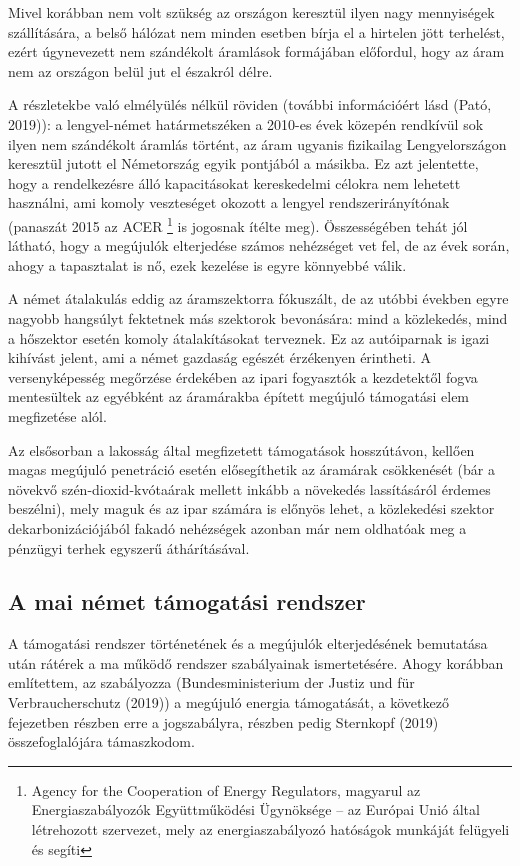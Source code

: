 \documentclass[twoside, magyar, showtrims]{corvinusphd}
\begin{document}
Mivel korábban nem volt szükség az országon
keresztül ilyen nagy mennyiségek szállítására,
a belső hálózat nem minden esetben
bírja el a hirtelen jött terhelést, ezért
úgynevezett nem szándékolt áramlások
formájában előfordul, hogy az áram nem
az országon belül jut el északról délre.

A részletekbe való elmélyülés nélkül röviden
(további információért lásd (Pató, 2019)):
a lengyel-német határmetszéken a 2010-es
évek közepén rendkívül sok ilyen nem szándékolt
áramlás történt, az áram ugyanis fizikailag
Lengyelországon keresztül jutott el
Németország egyik pontjából a másikba.
Ez azt jelentette, hogy a rendelkezésre álló
kapacitásokat kereskedelmi célokra nem lehetett
használni, ami komoly veszteséget okozott a lengyel
rendszerirányítónak (panaszát 2015 az
ACER \footnote{Agency for the Cooperation of Energy Regulators,
magyarul az Energiaszabályozók Együttműködési Ügynöksége
-- az Európai Unió által létrehozott szervezet, mely
az energiaszabályozó hatóságok munkáját felügyeli és segíti}
is jogosnak ítélte meg).
Összességében tehát jól látható,
hogy a megújulók elterjedése számos nehézséget
vet fel, de az évek során, ahogy a
tapasztalat is nő, ezek kezelése is egyre könnyebbé válik.

A német átalakulás eddig az áramszektorra fókuszált,
de az utóbbi években egyre nagyobb hangsúlyt
fektetnek más szektorok bevonására: mind a közlekedés,
mind a hőszektor esetén komoly
átalakításokat terveznek.
Ez az autóiparnak is igazi kihívást jelent,
ami a német gazdaság egészét érzékenyen érintheti.
A versenyképesség megőrzése érdekében
az ipari fogyasztók a kezdetektől fogva
mentesültek az egyébként az áramárakba
épített megújuló támogatási elem megfizetése alól.

Az elsősorban a lakosság által megfizetett támogatások hosszútávon,
kellően magas megújuló penetráció esetén elősegíthetik
az áramárak csökkenését (bár a növekvő szén-dioxid-kvótaárak mellett
inkább a növekedés lassításáról érdemes beszélni),
mely maguk és az ipar számára is előnyös lehet,
a közlekedési szektor dekarbonizációjából
fakadó nehézségek azonban már nem oldhatóak
meg a pénzügyi terhek egyszerű áthárításával.

\subsection{A mai német támogatási rendszer}

A támogatási rendszer történetének és
a megújulók elterjedésének bemutatása
után rátérek a ma működő rendszer
szabályainak ismertetésére. Ahogy korábban említettem,
az  szabályozza (Bundesministerium der Justiz und für Verbraucherschutz (2019))
a megújuló energia támogatását, a következő
fejezetben részben erre a jogszabályra, részben pedig Sternkopf (2019)
összefoglalójára támaszkodom.
\end{document}

